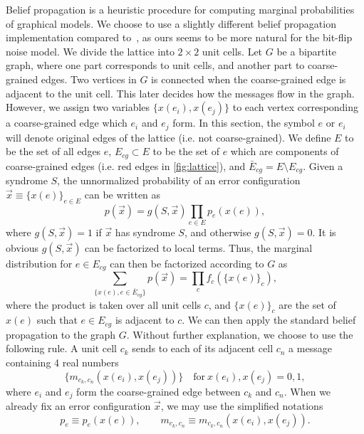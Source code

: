 Belief propagation is a heuristic procedure for computing marginal probabilities of graphical models.
We choose to use a slightly different belief propagation implementation compared to~\cite{duclos2010fast}, as ours seems to be more natural for the bit-flip noise model.
We divide the lattice into $2\times 2$ unit cells.
Let $G$ be a bipartite graph, where one part corresponds to unit cells, and another part to coarse-grained edges.
Two vertices in $G$ is connected when the coarse-grained edge is adjacent to the unit cell.
This later decides how the messages flow in the graph.
However, we assign two variables $\{x(e_i),x(e_j)\}$ to each vertex corresponding a coarse-grained edge which $e_i$ and $e_j$ form.
In this section, the symbol $e$ or $e_i$ will denote original edges of the lattice (i.e. not coarse-grained).
We define $E$ to be the set of all edges $e$, $E_{cg} \subset E$ to be the set of $e$ which are components of coarse-grained edges (i.e. red edges in \autoref{fig:lattice}), and $\bar{E}_{cg} = E \setminus E_{cg}$.
Given a syndrome $S$, the unnormalized probability of an error configuration $\vec{x}\equiv \{x(e)\}_{e\in E}$ can be written as
\begin{equation}
p(\vec{x}) = g(S, \vec{x})\prod_{e\in E} p_e(x(e)) ,
\end{equation}
where $g(S, \vec{x}) = 1$ if $\vec{x}$ has syndrome $S$, and otherwise $g(S, \vec{x}) = 0$.
It is obvious $g(S, \vec{x})$ can be factorized to local terms.
Thus, the marginal distribution for $e\in E_{cg}$ can then be factorized according to $G$ as
\begin{equation}
\sum_{\{x(e), e\in \bar{E}_{cg}\}}p(\vec{x}) =  \prod_c f_c(\{x(e)\}_c) ,
\end{equation}
where the product is taken over all unit cells $c$, and $\{x(e)\}_c$ are the set of $x(e)$ such that $e\in E_{cg}$ is adjacent to $c$.
We can then apply the standard belief propagation to the graph $G$.
Without further explanation, we choose to use the following rule.
A unit cell $c_k$ sends to each of its adjacent cell $c_n$ a message containing 4 real numbers
\begin{equation}
\{m_{c_k, c_n}(x(e_i), x(e_j))\} \quad \text{for} \  x(e_i),x(e_j) = 0,1 ,
\end{equation}
where $e_i$ and $e_j$ form the coarse-grained edge between $c_k$ and $c_n$.
When we already fix an error configuration $\vec{x}$, we may use the simplified notations
\begin{equation}
p_e \equiv p_e(x(e)), \qquad m_{c_k, c_n} \equiv m_{c_k, c_n}(x(e_i), x(e_j)).
\end{equation}
